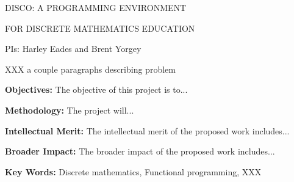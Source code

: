\centerline{\Large DISCO: A PROGRAMMING ENVIRONMENT}
\vspace{1ex}
\centerline{\Large FOR DISCRETE MATHEMATICS EDUCATION}
\vspace{3ex}
\centerline{\large PIs: Harley Eades and Brent Yorgey}
\vspace{3ex}

\begin{comment}
  The proposal must contain a summary of the proposed activity suitable
  for publication, not more than one page in length. It should not be an
  abstract of the proposal, but rather a self-contained description of the
  activity that would result if the proposal were funded. The summary
  should be written in the third person and include a statement of
  objectives and methods to be employed. It must clearly address in
  separate statements (within the one-page summary): (1) the intellectual
  merit of the proposed activity; and (2) the broader impacts resulting
  from the proposed activity. (See Chapter III for further descriptive
  information on the NSF merit review criteria.) It should be informative
  to other persons working in the same or related fields and, insofar as
  possible, understandable to a scientifically or technically literate lay
  reader. Proposals that do not separately address both merit review
  criteria within the one page Project Summary will be returned without
  review.
\end{comment}

XXX a couple paragraphs describing problem

{\bf Objectives: } The objective of this project is to...

{\bf Methodology: } The project will...

{\bf Intellectual Merit:} The intellectual merit of the proposed work
includes...

{\bf Broader Impact: } The broader impact of the proposed work
includes...

{\bf Key Words:} Discrete mathematics, Functional programming, XXX


